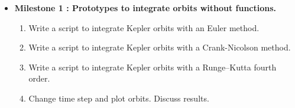 \documentclass[12pt, a4paper]{article}
\begin{document}
\begin{itemize}
	
	
\vspace{1cm}
%
%
%
%
% 
%
%
%
%
%
%
%
%
%
%  
% 
%
%

\item {\bf Milestone 1 : 
Prototypes to integrate orbits without functions.
  } 

\begin{enumerate} 
\item Write a script to integrate Kepler orbits with an Euler method. 
\item Write a script to integrate Kepler orbits with a Crank-Nicolson method. 
\item Write a script to integrate Kepler orbits with a Runge--Kutta fourth order.
\item Change time step and plot orbits. Discuss results. 
 \end{enumerate} 




\end{itemize}
\end{document}
